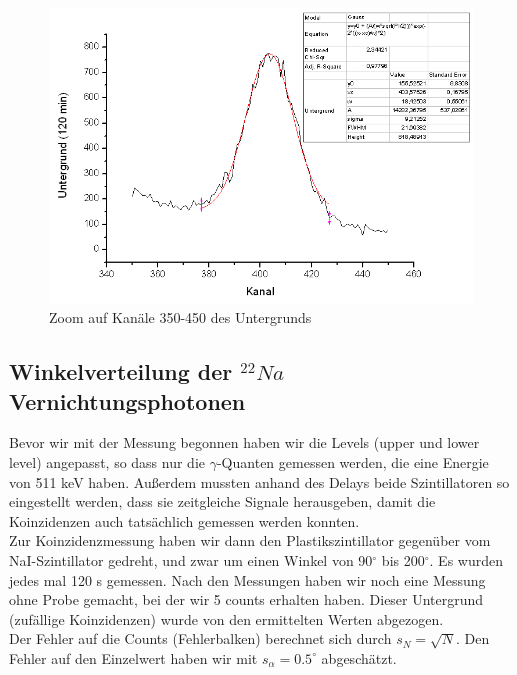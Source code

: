 \begin{figure}[H]
\centering \includegraphics[width = \textwidth]{auswertung/UG2.png}
\caption{Zoom auf Kanäle 350-450 des Untergrunds}
\end{figure}

\subsection{Winkelverteilung der $^{22}Na$ Vernichtungsphotonen}

Bevor wir mit der Messung begonnen haben wir die Levels (upper und lower level) angepasst, so dass nur die $\gamma$-Quanten gemessen werden, die eine Energie von 511 keV haben. Außerdem mussten anhand des Delays beide Szintillatoren so eingestellt werden, dass sie zeitgleiche Signale herausgeben, damit die Koinzidenzen auch tatsächlich gemessen werden konnten.\\

Zur Koinzidenzmessung haben wir dann den Plastikszintillator gegenüber vom NaI-Szintillator gedreht, und zwar um einen Winkel von 90$^\circ$ bis 200$^\circ$. Es wurden jedes mal 120 s gemessen. Nach den Messungen haben wir noch eine Messung ohne Probe gemacht, bei der wir 5 counts erhalten haben. Dieser Untergrund (zufällige Koinzidenzen) wurde von den ermittelten Werten abgezogen.\\

Der Fehler auf die Counts (Fehlerbalken) berechnet sich durch $s_N = \sqrt{N}$. Den Fehler auf den Einzelwert haben wir mit $s_\alpha = 0.5^\circ$ abgeschätzt.

